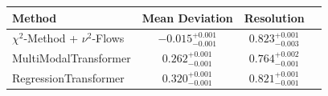     \begin{tabular}{lccc}
        \toprule
        Method & Mean Deviation & Resolution \\
        \midrule
        $\chi^2$-Method + $\nu^2$-Flows & $-0.015_{-0.001}^{+0.001}$ & $0.823_{-0.003}^{+0.001}$ \\
        MultiModalTransformer & $0.262_{-0.001}^{+0.001}$ & $0.764_{-0.001}^{+0.002}$ \\
        RegressionTransformer & $0.320_{-0.001}^{+0.001}$ & $0.821_{-0.001}^{+0.001}$ \\
        \bottomrule
    \end{tabular}
